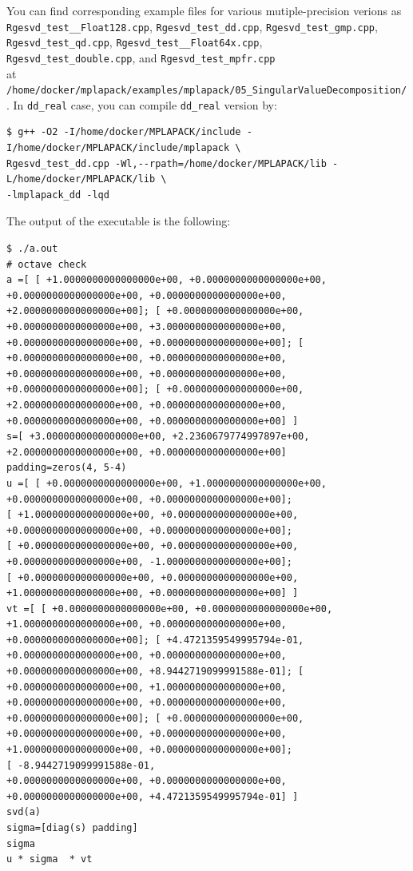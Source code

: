\documentclass[12pt]{article}
\begin{document}
You can find corresponding example files for various mutiple-precision verions as {\tt Rgesvd\_test\_\_Float128.cpp},
{\tt Rgesvd\_test\_dd.cpp}, {\tt Rgesvd\_test\_gmp.cpp}, {\tt Rgesvd\_test\_qd.cpp},
{\tt Rgesvd\_test\_\_Float64x.cpp}, \\
{\tt Rgesvd\_test\_double.cpp},  and {\tt Rgesvd\_test\_mpfr.cpp}\\
at {\tt /home/docker/mplapack/examples/mplapack/05\_SingularValueDecomposition/}.
In {\tt dd\_real} case, you can compile {\tt dd\_real} version by:
\begin{verbatim}
$ g++ -O2 -I/home/docker/MPLAPACK/include -I/home/docker/MPLAPACK/include/mplapack \
Rgesvd_test_dd.cpp -Wl,--rpath=/home/docker/MPLAPACK/lib -L/home/docker/MPLAPACK/lib \
-lmplapack_dd -lqd
\end{verbatim}
The output of the executable is the following:
{\footnotesize
\begin{verbatim}
$ ./a.out
# octave check
a =[ [ +1.0000000000000000e+00, +0.0000000000000000e+00, +0.0000000000000000e+00, +0.0000000000000000e+00,
+2.0000000000000000e+00]; [ +0.0000000000000000e+00, +0.0000000000000000e+00, +3.0000000000000000e+00,
+0.0000000000000000e+00, +0.0000000000000000e+00]; [ +0.0000000000000000e+00, +0.0000000000000000e+00,
+0.0000000000000000e+00, +0.0000000000000000e+00, +0.0000000000000000e+00]; [ +0.0000000000000000e+00,
+2.0000000000000000e+00, +0.0000000000000000e+00, +0.0000000000000000e+00, +0.0000000000000000e+00] ]
s=[ +3.0000000000000000e+00, +2.2360679774997897e+00, +2.0000000000000000e+00, +0.0000000000000000e+00]
padding=zeros(4, 5-4)
u =[ [ +0.0000000000000000e+00, +1.0000000000000000e+00, +0.0000000000000000e+00, +0.0000000000000000e+00];
[ +1.0000000000000000e+00, +0.0000000000000000e+00, +0.0000000000000000e+00, +0.0000000000000000e+00];
[ +0.0000000000000000e+00, +0.0000000000000000e+00, +0.0000000000000000e+00, -1.0000000000000000e+00];
[ +0.0000000000000000e+00, +0.0000000000000000e+00, +1.0000000000000000e+00, +0.0000000000000000e+00] ]
vt =[ [ +0.0000000000000000e+00, +0.0000000000000000e+00, +1.0000000000000000e+00, +0.0000000000000000e+00,
+0.0000000000000000e+00]; [ +4.4721359549995794e-01, +0.0000000000000000e+00, +0.0000000000000000e+00,
+0.0000000000000000e+00, +8.9442719099991588e-01]; [ +0.0000000000000000e+00, +1.0000000000000000e+00,
+0.0000000000000000e+00, +0.0000000000000000e+00, +0.0000000000000000e+00]; [ +0.0000000000000000e+00,
+0.0000000000000000e+00, +0.0000000000000000e+00, +1.0000000000000000e+00, +0.0000000000000000e+00];
[ -8.9442719099991588e-01,
+0.0000000000000000e+00, +0.0000000000000000e+00, +0.0000000000000000e+00, +4.4721359549995794e-01] ]
svd(a)
sigma=[diag(s) padding]
sigma
u * sigma  * vt
\end{verbatim}
}
\end{document}
